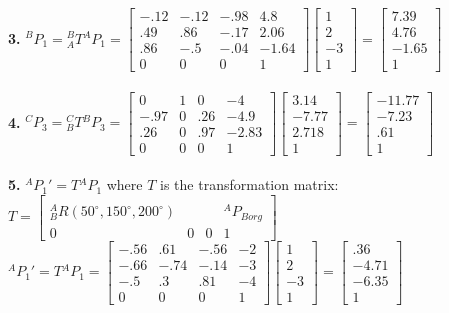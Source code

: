 \documentclass{article}
\begin{document}
\textbf{3. }
$^BP_1={}^B_AT{}^AP_1=\begin{bmatrix}
-.12 & -.12 & -.98 & 4.8\\
.49 & .86 & -.17 & 2.06\\
.86 & -.5 & -.04 & -1.64\\
0 & 0 & 0 & 1
\end{bmatrix}\begin{bmatrix}
1\\
2\\
-3\\
1
\end{bmatrix}=\begin{bmatrix}
7.39\\
4.76\\
-1.65\\
1
\end{bmatrix}$\\\\
\textbf{4. }
$^CP_3={}^C_BT{}^BP_3=\begin{bmatrix}
0 & 1 & 0 & -4\\
-.97 & 0 & .26 & -4.9\\
.26 & 0 & .97 & -2.83\\
0 & 0 & 0 & 1
\end{bmatrix}\begin{bmatrix}
3.14\\
-7.77\\
2.718\\
1
\end{bmatrix}=\begin{bmatrix}
-11.77\\
-7.23\\
.61\\
1
\end{bmatrix}$\\\\
\textbf{5. }
$^AP_1'=T{}^AP_1$ where $T$ is the transformation matrix: $T=\begin{bmatrix}
& & &\\
^A_BR(50^\circ,150^\circ,200^\circ) & & & {}^AP_{Borg}\\
0 & 0 & 0 & 1
\end{bmatrix}$\\
$^AP_1'=T{}^AP_1=\begin{bmatrix}
-.56 & .61 & -.56 & -2\\
-.66 & -.74 & -.14 & -3\\
-.5 & .3 & .81 & -4\\
0 & 0 & 0 & 1
\end{bmatrix}\begin{bmatrix}
1\\
2\\
-3\\
1
\end{bmatrix}=\begin{bmatrix}
.36\\
-4.71\\
-6.35\\
1
\end{bmatrix}$
\end{document}
